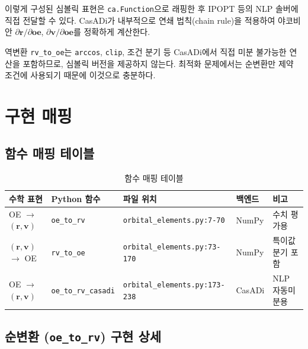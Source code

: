 \documentclass[11pt]{article}
\begin{document}
이렇게 구성된 심볼릭 표현은 \texttt{ca.Function}으로 래핑한 후 IPOPT 등의 NLP 솔버에 직접 전달할 수 있다. CasADi가 내부적으로 연쇄 법칙(chain rule)을 적용하여 야코비안 $\partial \mathbf{r}/\partial \mathbf{oe}$, $\partial \mathbf{v}/\partial \mathbf{oe}$를 정확하게 계산한다.

역변환 \texttt{rv\_to\_oe}는 \texttt{arccos}, \texttt{clip}, 조건 분기 등 CasADi에서 직접 미분 불가능한 연산을 포함하므로, 심볼릭 버전을 제공하지 않는다. 최적화 문제에서는 순변환만 제약 조건에 사용되기 때문에 이것으로 충분하다.

\section{구현 매핑}

\subsection{함수 매핑 테이블}

\begin{table}[h]
\centering
\begin{tabular}{lllll}
\toprule
수학 표현 & Python 함수 & 파일 위치 & 백엔드 & 비고 \\
\midrule
OE $\to$ $(\mathbf{r}, \mathbf{v})$ & \texttt{oe\_to\_rv} & \texttt{orbital\_elements.py:7-70} & NumPy & 수치 평가용 \\
$(\mathbf{r}, \mathbf{v})$ $\to$ OE & \texttt{rv\_to\_oe} & \texttt{orbital\_elements.py:73-170} & NumPy & 특이값 분기 포함 \\
OE $\to$ $(\mathbf{r}, \mathbf{v})$ & \texttt{oe\_to\_rv\_casadi} & \texttt{orbital\_elements.py:173-238} & CasADi & NLP 자동미분용 \\
\bottomrule
\end{tabular}
\caption{함수 매핑 테이블}
\label{tab:function_mapping}
\end{table}

\subsection{순변환 (\texttt{oe\_to\_rv}) 구현 상세}
\end{document}
